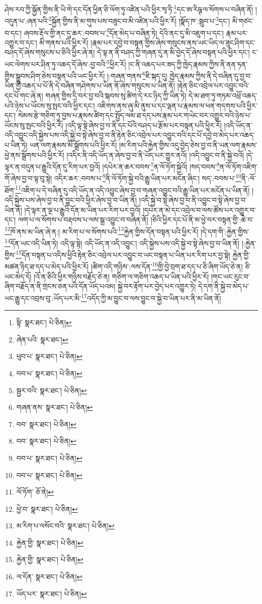ཤེས་རབ་ཀྱི་སྐྱོན་གྱིས་ནི་ཡི་གེ་དང་དོན་ཕྱིན་ཅི་ལོག་ཏུ་འཛིན་པའི་ཕྱིར་སྭ་ཏི་\footnote{སྟི་  སྣར་ཐང་།  པེ་ཅིན། }དང་ཨ་རིཥྚ་ལ་སོགས་པ་བཞིན་ནོ། །འདུན་པ་:ཞན་པའི་\footnote{ཞེན་པའི་  སྣར་ཐང་། }སྐྱོན་གྱིས་ནི་མ་གུས་པས་བཟུང་བ་མི་འཛིན་པའི་ཕྱིར་རོ། །སྣོད་ཁ་:སྦུབ་པ་\footnote{ཕུབ་པ་  སྣར་ཐང་།  པེ་ཅིན། }དང་། མི་གཙང་བ་དང་། ཞབས་རྡོལ་གྱི་ནང་དུ་ཆར་:བབས་པ་\footnote{བབ་པ་  སྣར་ཐང་།  པེ་ཅིན། }དོན་མེད་པ་བཞིན་ཏེ། དེའི་ནང་དུ་མི་འཇུག་པ་དང་། རྣམ་པར་འགྱུར་བ་དང་། མི་གནས་པའི་ཕྱིར་རོ། །རྣམ་པར་དབྱེ་བ་བསྟན་གྱིས་ཞེས་གསུངས་ནས་ཡང་ཡིད་ལ་ཟུང་ཤིག་དང་བཤད་དོ་ཞེས་གསུངས་པ་ཅིའི་ཕྱིར་ཞེ་ན། དེ་ལྟ་ན་ནི་བཤད་ཀྱི་གཞན་དུ་ན་མི་བྱེད་དོ་ཞེས་བསྟན་པའི་ཕྱིར་དང་། ང་ཡང་ལེགས་པར་ཤིན་ཏུ་འཆད་དོ་ཞེས་:བྱ་བའི་\footnote{སྦྱར་བའི་  སྣར་ཐང་།  པེ་ཅིན། }ཕྱིར་རོ། །ང་ནི་འཆད་པར་ཟད་ཀྱི་ཁྱེད་རྣམས་ཀྱིས་ནི་ནན་ཏན་གྱིས་སྒྲུབས་ཤིག་ཅེས་བསྟན་པའི་ཡང་ཕྱིར་རོ། །:གཞན་གནས་\footnote{གཞན་ནས་  སྣར་ཐང་།  པེ་ཅིན། }ཇི་སྐད་དུ། ཁྱེད་རྣམས་ཀྱིས་ནི་དེ་བཞིན་དུ་བྱ་བ་ཡིན་གྱི་འཆད་པ་པོ་ནི་དེ་བཞིན་གཤེགས་པ་ཡིན་ནོ་ཞེས་གསུངས་པ་ཡིན་ནོ། །རྟེན་ཅིང་འབྲེལ་པར་འབྱུང་བའི་དང་པོ་གང་ཞེ་ན། གཞན་གྱིས་དྲི་བར་བྱ་བའི་སྐབས་སུ་ཚིག་དེ་རང་ཉིད་ཀྱི་ཡིན་ཏེ། དེ་མ་ཐག་ཏུ་གཏམ་འཕྲོ་འཆད་པའི་ཉེས་པ་ཡོངས་སུ་སྤང་བའི་ཕྱིར་དང་། འཇིགས་ནས་ཞུ་མི་ནུས་པ་དང་ལྡན་པ་རྣམས་ལ་ཕན་གདགས་པའི་ཕྱིར་དང་། སེམས་རྩེ་གཅིག་ཏུ་བྱས་པ་རྣམས་ཚིག་དང་སྤྱོད་ལམ་ཐ་དད་པས་རྣམ་པར་གཡེང་བར་འགྱུར་བའི་ཉེས་པ་ཡོངས་སུ་སྤང་བའི་ཕྱིར་རོ། །འདི་ལྟ་སྟེ་ཞེས་བྱ་བ་ནི་དང་པོའི་བཤད་པ་རྩོམ་པར་བསྟན་པའི་ཕྱིར་རོ། །འདི་ཡོད་ན་འདི་འབྱུང་འདི་སྐྱེས་པས་འདི་སྐྱེ་བ་སྟེ་ཞེས་བྱ་བ་ནི་རྟེན་ཅིང་འབྲེལ་པར་འབྱུང་བའི་དང་པོ་དབྱེ་བ་མེད་པར་འཆད་པ་ཡིན་ཏེ། ཡན་ལག་རྣམས་མི་སྒྲོགས་པའི་ཕྱིར་རོ། །མ་རིག་པའི་རྐྱེན་གྱིས་འདུ་བྱེད་ཅེས་བྱ་བ་ནི་ཡན་ལག་རྣམས་ཕྱེ་ནས་སྒྲོགས་པའི་ཕྱིར་རོ། །འདིར་ནི་འདི་ཡོད་ན་ཞེས་བྱ་བ་ནི་ཡོད་པར་གྱུར་ནའོ། །འདི་འབྱུང་བ་ནི་སྐྱེ་བའོ། །དེ་ལྟར་ན་བདུན་པ་རྒྱུའི་དོན་དུ་རིག་པར་བྱའོ། །དཔེར་ན་ཆར་བབས་\footnote{བབ་  སྣར་ཐང་།  པེ་ཅིན། }ན་ལོ་ཏོག་སྐྱེའོ། །སད་བབས་\footnote{བབ་  སྣར་ཐང་།  པེ་ཅིན། }ན་ལོ་ཏོག་འཇིག་གོ་ཞེས་བྱ་བ་ལྟ་བུ་སྟེ། འདིར་ཆར་:བབས་པ་\footnote{བབ་པ་  སྣར་ཐང་།  པེ་ཅིན། }ནི་ལོ་ཏོག་སྐྱེ་བའི་རྒྱུ་ཡིན་པར་མངོན་ཞིང་། སད་:བབས་པ་\footnote{བབ་པ་  སྣར་ཐང་།  པེ་ཅིན། }ནི་:ལོ་ཐོག་\footnote{ལོ་ཏོག་  ཅོ་ནེ། }འཇིག་པ་དེ་བཞིན་དུ་འདི་ཡོད་ན་འདི་འབྱུང་ཞེས་བྱ་བ་གཞན་འབྱུང་བའི་རྒྱུ་ཡིན་པར་མངོན་པ་ཡིན་ནོ། །འདི་སྐྱེས་པས་ཞེས་བྱ་བ་ནི་བྱུང་བའི་ཕྱིར་ཞེས་བྱ་བ་ཡིན་ནོ། །འདི་སྐྱེ་བ་སྟེ་ཞེས་བྱ་བ་ནི་འབྱུང་བ་སྟེ་ཞེས་བྱ་བ་ཡིན་ནོ། །དེ་ལྟར་ན་ལྔ་པ་རྒྱུའི་དོན་མ་ཡིན་པར་རིག་པར་བྱའོ། །དཔེར་ན་མེ་དང་འབྲེལ་བ་ལས་ཚོས་པར་འགྱུར་བ་དང་། ལག་པ་ལ་སོགས་པ་བརྡབས་པ་ལས་སྒྲ་འབྱུང་བ་བཞིན་ནོ། །ཅིའི་ཕྱིར་དང་པོ་ནི་མ་ཕྱེ་བར་བསྟན་གྱི་:ཆེ་བ་\footnote{ཕྱེ་བ་  སྣར་ཐང་།  པེ་ཅིན། }ཁོ་ནས་མ་ཡིན་ཞེ་ན:། མ་རིག་པ་ལ་སོགས་པའི་\footnote{མ་རིག་པ་ལསོང་བའི་  སྣར་ཐང་།  པེ་ཅིན། }རྐྱེན་གྱིས་དོན་བསྟན་པའི་ཕྱིར་རོ། །དེ་དག་གི་:རྐྱེན་གྱིས་\footnote{རྐྱེན་གྱི་  སྣར་ཐང་།  པེ་ཅིན། }དོན་ཡང་འདི་ཡིན་ཏེ། འདི་ལྟ་སྟེ། འདི་ཡོད་ན་འདི་འབྱུང་། འདི་སྐྱེས་པས་འདི་སྐྱེ་བ་སྟེ་ཞེས་བྱ་བ་ཡིན་ནོ། །:རྐྱེན་གྱིས་\footnote{རྐྱེན་གྱི་  སྣར་ཐང་།  པེ་ཅིན། }དོན་བསྟན་པ་འདིས་ཕྱིའི་རྟེན་ཅིང་འབྲེལ་པར་འབྱུང་བ་ཡང་བསྟན་པ་ཡིན་པར་རིག་པར་བྱ་སྟེ། རྐྱེན་གྱི་མཚན་ཉིད་ཐ་དད་པ་མེད་པའི་ཕྱིར་རོ། །ཚིག་འདི་གཉིས་:ལས་དོན་\footnote{ལ་དོན་  སྣར་ཐང་།  པེ་ཅིན། }གྱི་བྱེ་བྲག་ཐ་དད་པ་ཅི་ཞིག་ཡོད་ཅེ་ན། ཅི་ཡང་མེད་དོ། །འོ་ན་ཅིའི་ཕྱིར་གཉིས་བརྗོད་ཅེ་ན། གཅིག་ལ་གཅིག་འཆད་པ་ཡིན་པའི་ཕྱིར་རོ། །གང་ཡང་རུང་བ་ཞིག་བརྗོད་ན་ནི་གྲངས་ཅན་པའི་དོན་ཡོད་པའམ། སྐྱེ་བར་རྟོག་པར་བྱེད་པར་འགྱུར་ཏེ། དེ་དག་ནི་སྐྱེ་བ་མེད་པ་ཡང་རྒྱུ་དང་འབྲས་བུ་:ཡོད་པར་མི་\footnote{ཡོད་པར་  སྣར་ཐང་།  པེ་ཅིན། }འདོད་ཀྱི་མ་བྱུང་བ་ལས་བྱུང་བ་སྐྱེ་བ་ཡིན་པར་ནི་མ་ཡིན་ནོ། 